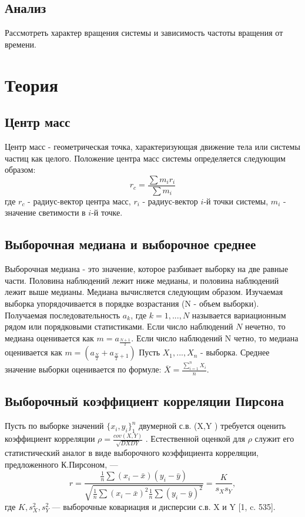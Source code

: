 \documentclass[a4paper,12pt]{article} %
\begin{document}
	\subsection{Анализ}
	Рассмотреть характер вращения системы и зависимость частоты вращения от времени.
	
	
	\section{Теория}
	\subsection{Центр масс}
	Центр масс - геометрическая точка, характеризующая движение тела или системы частиц как целого. 
	Положение центра масс системы определяется следующим образом:
	\begin{equation}
	r_{c}= \frac{\sum m_{i}r_{i}}{\sum m_{i}}
	\end{equation}
	где $r_{c}$ - радиус-вектор центра масс, $r_{i}$ -  радиус-вектор $i$-й точки системы, $m_{i}$ - значение светимости в $i$-й точке.
	
	\subsection{Выборочная медиана и выборочное среднее}
	Выборочная медиана - это значение, которое разбивает выборку на две равные части. Половина наблюдений лежит ниже медианы, и половина наблюдений лежит выше медианы.
	Медиана вычисляется следующим образом. Изучаемая выборка упорядочивается в порядке возрастания (N - объем выборки). Получаемая последовательность $a_{k}$, где $k=1,...,N$ называется вариационным рядом или порядковыми статистиками. Если число наблюдений $N$ нечетно, то медиана оценивается как $m=a_{\frac{N+1}{2}}$.
	Если число наблюдений N четно, то медиана оценивается как $m=(a_{\frac{N}{2}} + a_{\frac{N}{2} + 1})$
	\newline Пусть $X_{1}, ..., X_{n}$ - выборка. Среднее значение выборки оценивается по формуле: $\overline{X}= \frac{\sum_{i=1}^{n}X_{i}}{n}$.
	
	\subsection{Выборочный коэффициент корреляции Пирсона}
	Пусть по выборке значений $\{x_{i},y_{i}\}^{n}_{1}$ двумерной с.в. (X,Y ) требуется оценить коэффициент корреляции $\rho = \frac{cov(X,Y)}{\sqrt{DXDY}}$ . Естественной оценкой для $\rho$ служит его статистический аналог в виде выборочного коэффициента корреляции, предложенного К.Пирсоном, —
	\begin{equation}
	r = \frac{
		\frac{1}{n}\sum{(x_{i} - \bar{x})(y_{i}-\bar{y})}
	}{
		\sqrt{\frac{1}{n}\sum{(x_{i} - \bar{x})^{2}}\frac{1}{n}\sum{(y_{i} - \bar{y})^{2}}}
	}=\frac{K}{s_{X}s_{Y}},
	\label{r}
	\end{equation}
	где $K,s^{2}_{X},s^{2}_{Y}$ — выборочные ковариация и дисперсии с.в. X и Y [1, c. 535].
	
\end{document}
